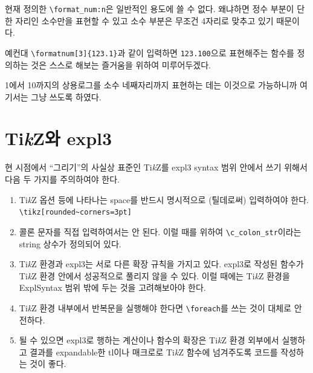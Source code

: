 \documentclass[a4paper,amsmath]{oblivoir}
\newcommand\tikzlogo{Ti\textit{k}Z}
\begin{document}
현재 정의한 \verb|\format_num:n|은 일반적인 용도에 쓸 수 없다. 왜냐하면 정수 부분이 단 한 자리인 소수만을 표현할 수 있고 소수 부분은 무조건 4자리로 맞추고 있기 때문이다. 

예컨대 \verb|\formatnum[3]{123.1}|과 같이 입력하면 \verb|123.100|으로 표현해주는 함수를 정의하는 것은 스스로 해보는 즐거움을 위하여 미루어두겠다.

1에서 10까지의 상용로그를 소수 네째자리까지 표현하는 데는 이것으로 가능하니까 여기서는 그냥 쓰도록 하였다.



\section{\tikzlogo 와 expl3}

현 시점에서 “그리기”의 사실상 표준인 \tikzlogo 를 expl3 syntax 범위 안에서 쓰기 위해서 다음 두 가지를 주의하여야 한다.

\begin{enumerate}[(1)] \firmlist
\item \tikzlogo{} 옵션 등에 나타나는 space를 반드시 명시적으로 (틸데로써) 입력하여야 한다. \\
\verb|\tikz[rounded~corners=3pt]|

\item 콜론 문자를 직접 입력하여서는 안 된다. 이럴 때를 위하여 \verb|\c_colon_str|이라는 string 상수가 정의되어 있다.

\item \tikzlogo{} 환경과 expl3는 서로 다른 확장 규칙을 가지고 있다. expl3로 작성된 함수가 \tikzlogo{} 환경 안에서 성공적으로 풀리지 않을 수 있다. 이럴 때에는 \tikzlogo{} 환경을 ExplSyntax 범위 밖에 두는 것을 고려해보아야 한다.

\item \tikzlogo{} 환경 내부에서 반복문을 실행해야 한다면 \verb|\foreach|를 쓰는 것이 대체로 안전하다.

\item 될 수 있으면 expl3로 행하는 계산이나 함수의 확장은 \tikzlogo{} 환경 외부에서 실행하고 결과를 expandable한 tl이나 매크로로 \tikzlogo{} 함수에 넘겨주도록 코드를 작성하는 것이 좋다.
\end{enumerate}
\end{document}

